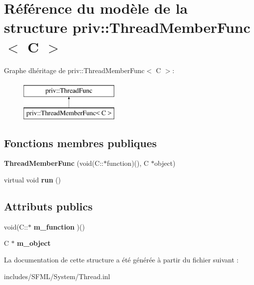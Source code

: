 \hypertarget{structpriv_1_1ThreadMemberFunc}{}\section{Référence du modèle de la structure priv\+:\+:Thread\+Member\+Func$<$ C $>$}
\label{structpriv_1_1ThreadMemberFunc}
Graphe d\textquotesingle{}héritage de priv\+:\+:Thread\+Member\+Func$<$ C $>$\+:\begin{figure}[H]
\begin{center}
\leavevmode
\includegraphics[height=2.000000cm]{structpriv_1_1ThreadMemberFunc}
\end{center}
\end{figure}
\subsection*{Fonctions membres publiques}
\begin{DoxyCompactItemize}
\item 
\mbox{\label{structpriv_1_1ThreadMemberFunc_ae44619c4cf6d886da6f32a1de37d652e}} 
{\bfseries Thread\+Member\+Func} (void(C\+::$\ast$function)(), C $\ast$object)
\item 
\mbox{\label{structpriv_1_1ThreadMemberFunc_abbd440e93edf2747cf9cdde579bc5de0}} 
virtual void {\bfseries run} ()
\end{DoxyCompactItemize}
\subsection*{Attributs publics}
\begin{DoxyCompactItemize}
\item 
\mbox{\label{structpriv_1_1ThreadMemberFunc_a2b3e753f87b70ae3ad1c4ff54a995fe8}} 
void(C\+::$\ast$ {\bfseries m\+\_\+function} )()
\item 
\mbox{\label{structpriv_1_1ThreadMemberFunc_a849dd2e31c95e699fb316065d9d75116}} 
C $\ast$ {\bfseries m\+\_\+object}
\end{DoxyCompactItemize}


La documentation de cette structure a été générée à partir du fichier suivant \+:\begin{DoxyCompactItemize}
\item 
includes/\+S\+F\+M\+L/\+System/Thread.\+inl\end{DoxyCompactItemize}

